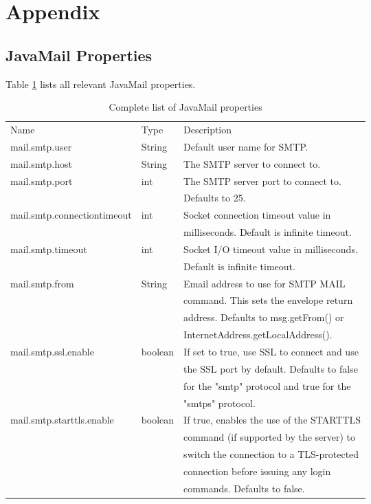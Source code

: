\documentclass[envcountsame,envcountchap,letterpaper]{svmono}
\begin{document}
\part*{Appendix}

\chapter*{JavaMail Properties}

Table \ref{tab:javamail-properties} lists all relevant JavaMail properties.

\begin{table}
\centering
\caption{Complete list of JavaMail properties}
\label{tab:javamail-properties}
\begin{tabular}{lll}
\hline\noalign{\smallskip}
Name & Type & Description  \\
\noalign{\smallskip}\hline\noalign{\smallskip}
mail.smtp.user & String & Default user name for SMTP. \\
mail.smtp.host & String & The SMTP server to connect to. \\
mail.smtp.port & int & The SMTP server port to connect to.\\ & & Defaults to 25. \\
mail.smtp.connectiontimeout & int & Socket connection timeout value in \\ & & milliseconds. Default is infinite timeout.\\
mail.smtp.timeout & int & Socket I/O timeout value in milliseconds. \\ & & Default is infinite timeout. \\
mail.smtp.from & String & Email address to use for SMTP MAIL \\ & & command. This sets the envelope return \\ & & address. Defaults to msg.getFrom() or \\ & & InternetAddress.getLocalAddress(). \\
mail.smtp.ssl.enable & boolean & If set to true, use SSL to connect and use \\ & & the SSL port by default. Defaults to false \\ & & for the "smtp" protocol and true for the \\ & & "smtps" protocol. \\
mail.smtp.starttls.enable & boolean & If true, enables the use of the STARTTLS\\ & & command (if supported by the server) to\\ & & switch the connection to a TLS-protected\\ & & connection before issuing any login\\ & & commands. Defaults to false. \\

\end{tabular}
\end{table}
\end{document}
